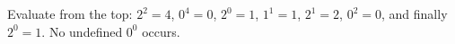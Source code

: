 Evaluate from the top: $2^2=4$, $0^4=0$, $2^0=1$, $1^1=1$, $2^1=2$, $0^2=0$, and finally $2^0=\boxed1$. No undefined $0^0$ occurs.
